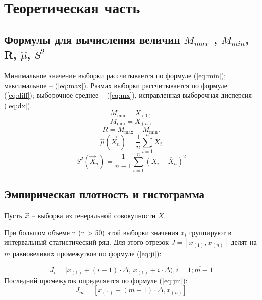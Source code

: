 \chapter{Теоретическая часть}
\section{Формулы для вычисления величин $M_{max}$ , $M_{min}$, R, $\hat\mu$, $S^2$}
Минимальное значение выборки рассчитывается по формуле (\ref{eq:min}); максимальное -- (\ref{eq:max}). Размах выборки рассчитывается по формуле (\ref{eq:diff}); выборочное среднее -- (\ref{eq:mx}), исправленная выборочная дисперсия -- (\ref{eq:dx}).
\begin{equation}
	\label{eq:min}
	M_{\min} = X_{(1)}
\end{equation}
\begin{equation}
	\label{eq:max}
	M_{\min} = X_{(n)}
\end{equation}
\begin{equation}
	\label{eq:diff}
	R = M_{\max} - M_{\min}.
\end{equation}
\begin{equation}
	\label{eq:mx}
	\hat\mu(\vec X_n) = \frac 1n \sum_{i=1}^n X_i
\end{equation}
\begin{equation}
	\label{eq:dx}
	S^2(\vec X_n) = \frac 1{n - 1} \sum_{i=1}^n (X_i-\overline X_n)^2
\end{equation}

\section{Эмпирическая плотность и гистограмма}
Пусть $\vec x$ -- выборка из генеральной совокупности $X$. 

При большом объеме n (n > 50) этой выборки  значения $x_i$ группируют в интервальный статистический ряд. Для этого отрезок $J = [x_{(1)}, x_{(n)}]$ делят на $m$ равновеликих промежутков по формуле (\ref{eq:ji}):

\begin{equation}
	\label{eq:ji}
	J_i = [x_{(1)} + (i - 1) \cdot \Delta,\ x_{(1)} + i \cdot \Delta), i = \overline{1; m - 1}
\end{equation}
Последний промежуток определяется по формуле (\ref{eq:jm}):
\begin{equation}
	\label{eq:jm}
	J_{m} = [x_{(1)} + (m - 1) \cdot \Delta, x_{(n)}]
\end{equation}

